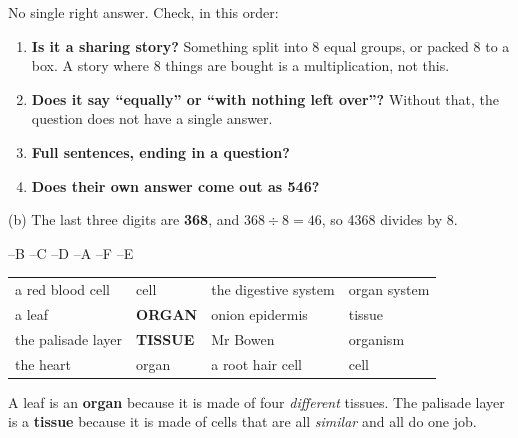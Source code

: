 \documentclass[12pt,a4paper]{article}
\begin{document}
\noindent No single right answer. Check, in this order:
\begin{enumerate}[label=\arabic*., itemsep=2pt]
  \item \textbf{Is it a sharing story?} Something split into 8 equal groups, or packed
        8 to a box. A story where 8 things are bought is a multiplication, not this.
  \item \textbf{Does it say ``equally'' or ``with nothing left over''?} Without that,
        the question does not have a single answer.
  \item \textbf{Full sentences, ending in a question?}
  \item \textbf{Does their own answer come out as 546?}
\end{enumerate}
\noindent (b) The last three digits are \textbf{368}, and $368 \div 8 = 46$, so 4368
divides by 8.

\smallskip
{}

--B --C --D --A --F --E

\noindent
\begin{tabularx}{\linewidth}{@{}p{4.4cm}p{3.4cm}p{4.4cm}X@{}}
  a red blood cell   & cell         & the digestive system & organ system \\
  a leaf             & \textbf{ORGAN}  & onion epidermis   & tissue \\
  the palisade layer & \textbf{TISSUE} & Mr Bowen          & organism \\
  the heart          & organ        & a root hair cell     & cell \\
\end{tabularx}

\smallskip
\noindent A leaf is an \textbf{organ} because it is made of four \emph{different}
tissues. The palisade layer is a \textbf{tissue} because it is made of cells that are
all \emph{similar} and all do one job.

\smallskip
{}
\end{document}

